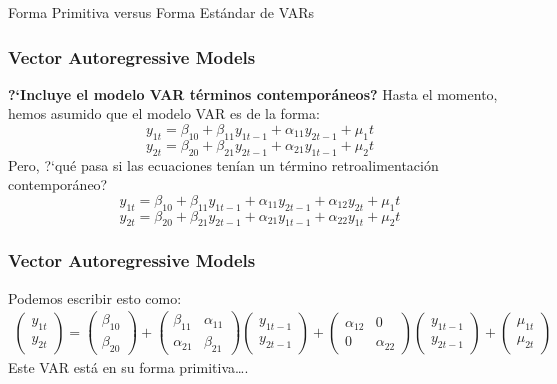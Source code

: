 \documentclass[spanish,xcolor=table]{beamer}
\begin{document}
\begin{section}{Forma Primitiva versus Forma Estándar de VARs}
\begin{frame}
\frametitle{Vector Autoregressive Models}

\textbf{?`Incluye el modelo VAR t\'erminos contempor\'aneos?}
Hasta el momento, hemos asumido que el modelo VAR es de la forma:\\
\begin{equation*}
y_{1t} = \beta_{10} + \beta_{11} y_{1t-1} + \alpha_{11} y_{2t-1} + \mu_1t
\end{equation*}
\begin{equation*}
y_{2t} = \beta_{20} + \beta_{21} y_{2t-1} + \alpha_{21} y_{1t-1} + \mu_2t
\end{equation*}
Pero, ?`qu\'e pasa si las ecuaciones ten\'{i}an un t\'ermino retroalimentaci\'on contempor\'aneo?\\
\begin{equation*}
y_{1t} = \beta_{10} + \beta_{11} y_{1t-1} + \alpha_{11} y_{2t-1} + \alpha_{12} y_{2t} + \mu_1t
\end{equation*}
\begin{equation*}
y_{2t} = \beta_{20} + \beta_{21} y_{2t-1} + \alpha_{21} y_{1t-1} + \alpha_{22} y_{1t} + \mu_2t
\end{equation*}

\end{frame}
\begin{frame}
\frametitle{Vector Autoregressive Models}

Podemos escribir esto como:\\
\begin{gather*}
\begin{pmatrix} y_{1t} \\ y_{2t} \end{pmatrix}
 =
\begin{pmatrix} \beta_{10} \\ \beta_{20} \end{pmatrix}
+
\begin{pmatrix} \beta_{11} & \alpha_{11} \\ \alpha_{21} & \beta_{21} \end{pmatrix}
\begin{pmatrix} y_{1t-1} \\ y_{2t-1} \end{pmatrix}
+
\begin{pmatrix} \alpha_{12} & 0 \\ 0 & \alpha_{22} \end{pmatrix}
\begin{pmatrix} y_{1t-1} \\ y_{2t-1} \end{pmatrix}
+
\begin{pmatrix} \mu_{1t} \\ \mu_{2t} \end{pmatrix}
\end{gather*}
Este VAR est\'a en su forma primitiva….


\end{frame}
\end{section}
\end{document}
